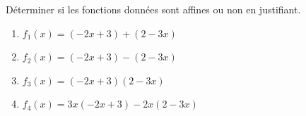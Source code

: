 \begin{exo}{}
	Déterminer si les fonctions données sont affines ou non en justifiant.
	\begin{enumerate}
		\item $f_1(x) = (-2x + 3) + (2 - 3x)$
		\item $f_2(x) = (-2x + 3) - (2 - 3x)$
		\item $f_3(x) = (-2x + 3)(2 - 3x)$
		\item $f_4(x) = 3x(-2x + 3) - 2x(2 - 3x)$
	\end{enumerate}
\end{exo}
